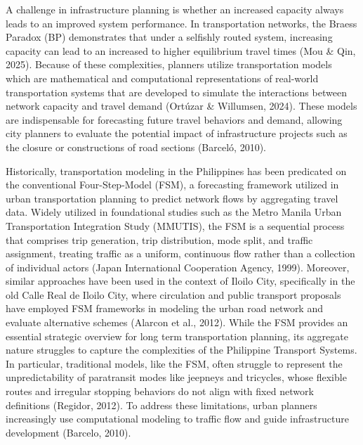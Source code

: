 A challenge in infrastructure planning is whether an increased capacity always leads to an improved system performance. In transportation networks, the Braess Paradox (BP) demonstrates that under a selfishly routed system, increasing capacity can lead to an increased to higher equilibrium travel times (Mou \& Qin, 2025). Because of these complexities, planners utilize transportation models which are mathematical and computational representations of real-world transportation systems that are developed to simulate the interactions between network capacity and travel demand (Ortúzar \& Willumsen, 2024). These models are indispensable for forecasting future travel behaviors and demand, allowing city planners to evaluate the potential impact of infrastructure projects such as the closure or constructions of road sections (Barceló, 2010). 

Historically, transportation modeling in the Philippines has been predicated on the conventional Four-Step-Model (FSM), a forecasting framework utilized in urban transportation planning to predict network flows by aggregating travel data. Widely utilized in foundational studies such as the Metro Manila Urban Transportation Integration Study (MMUTIS), the FSM is a sequential process that comprises trip generation, trip distribution, mode split, and traffic assignment, treating traffic as a uniform, continuous flow rather than a collection of individual actors (Japan International Cooperation Agency, 1999).  Moreover, similar approaches have been used in the context of Iloilo City, specifically in the old Calle Real de Iloilo City, where circulation and public transport proposals have employed FSM frameworks in modeling the urban road network and evaluate alternative schemes (Alarcon et al., 2012). While the FSM provides an essential strategic overview for long term transportation planning, its aggregate nature struggles to capture the complexities of the Philippine Transport Systems. In particular, traditional models, like the FSM, often struggle to represent the unpredictability of paratransit modes like jeepneys and tricycles, whose flexible routes and irregular stopping behaviors do not align with fixed network definitions (Regidor, 2012). To address these limitations, urban planners increasingly use computational modeling to traffic flow and guide infrastructure development (Barcelo, 2010). 

